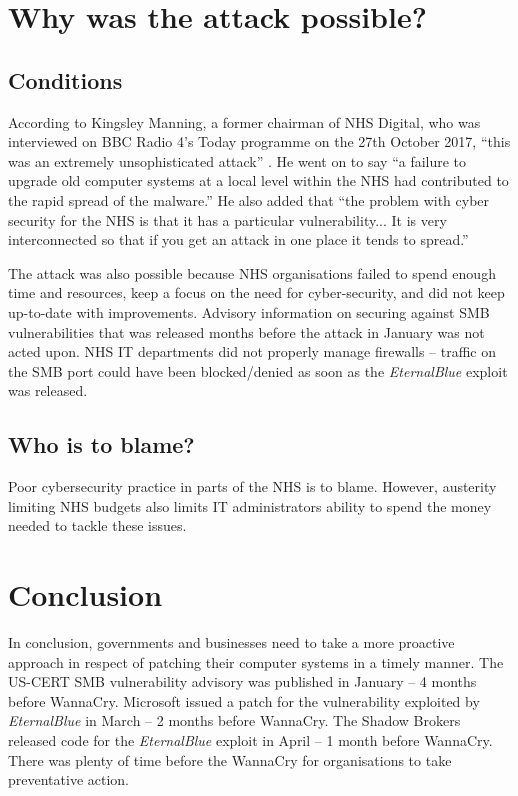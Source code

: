 \documentclass[12pt]{article}
\begin{document}
\section{Why was the attack possible?}
\subsection{Conditions}
According to Kingsley Manning, a former chairman of NHS Digital, who was interviewed on BBC Radio 4's Today programme on the 27th October 2017, ``this was an extremely unsophisticated attack'' \citep[October 27\textsuperscript{th}]{radiointerview:bbcr4:today:20171027}. He went on to say ``a failure to upgrade old computer systems at a local level within the NHS had contributed to the rapid spread of the malware.'' He also added that ``the problem with cyber security for the NHS is that it has a particular vulnerability... It is very interconnected so that if you get an attack in one place it tends to spread.''

The attack was also possible because NHS organisations failed to spend enough time and resources, keep a focus on the need for cyber-security, and did not keep up-to-date with improvements. Advisory information on securing against SMB vulnerabilities that was released months before the attack in January was not acted upon. NHS IT departments did not properly manage firewalls -- traffic on the SMB port could have been blocked/denied as soon as the \textit{EternalBlue} exploit was released.

\subsection{Who is to blame?}
Poor cybersecurity practice in parts of the NHS is to blame. However, austerity limiting NHS budgets also limits IT administrators ability to spend the money needed to tackle these issues.


\section{Conclusion}
In conclusion, governments and businesses need to take a more proactive approach in respect of patching their computer systems in a timely manner. The US-CERT SMB vulnerability advisory was published in January -- 4 months before WannaCry. Microsoft issued a patch for the vulnerability exploited by \textit{EternalBlue} in March -- 2 months before WannaCry. The Shadow Brokers released code for the \textit{EternalBlue} exploit in April -- 1 month before WannaCry. There was plenty of time before the WannaCry for organisations to take preventative action.

\pagebreak


\raggedright

\end{document}
